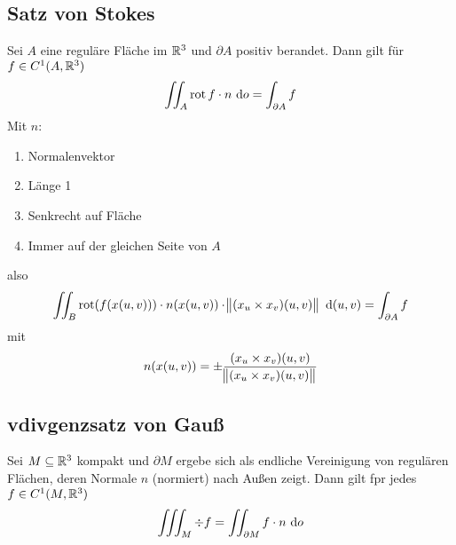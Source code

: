 \subsection{Satz von Stokes}
Sei $A$ eine reguläre Fläche im $\mathbb{R}^3$ und $\partial A$ positiv berandet. Dann
gilt für $f \in C^1(A, \mathbb{R}^3)$
\begin{equation*}
    \iint_A \operatorname{rot} f \cdot n \text{ d}o= \int_{\partial A} f
\end{equation*}
Mit $n$:
\begin{enumerate}[label = (\roman*)]
    \item Normalenvektor
    \item Länge 1
    \item Senkrecht auf Fläche
    \item Immer auf der gleichen Seite von $A$
\end{enumerate}
also
\begin{equation*}
    \iint_B \operatorname{rot}(f(x(u,v))) \cdot n(x(u,v)) \cdot \norm{(x_u \times x_v)(u,v)}
    \text{ d}(u,v) = \int_{\partial A} f
\end{equation*}
mit
\begin{equation*}
    n(x(u,v)) = \pm \frac{(x_u \times x_v)(u,v)}{\norm{(x_u \times x_v)(u,v)}}
\end{equation*}

\subsection{vdivgenzsatz von Gauß}
Sei $M \subseteq \mathbb{R}^3$ kompakt und $\partial M$ ergebe sich als endliche
Vereinigung von regulären Flächen, deren Normale $n$ (normiert) nach Außen
zeigt. Dann gilt fpr jedes $f \in C^1(M, \mathbb{R}^3)$
\begin{equation*}
    \iiint_M \div f = \iint_{\partial M} f \cdot n \text{ d}o
\end{equation*}
